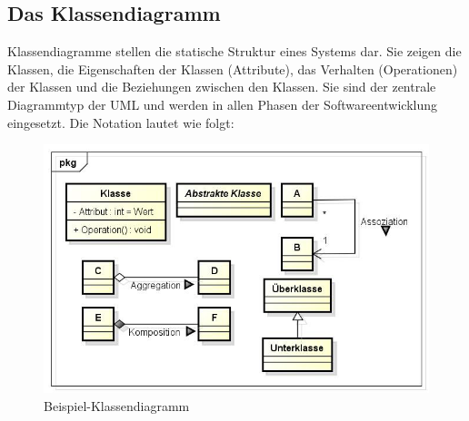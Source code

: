 \documentclass[a4paper,10pt,DIV9, BCOR12mm, oneside,openright,openbib]{scrreprt}
\theoremstyle{definition}
\theoremstyle{plain}
\begin{document}
\subsection{Das Klassendiagramm}
Klassendiagramme stellen die statische Struktur eines Systems dar. Sie zeigen die Klassen, die Eigenschaften der Klassen (Attribute), das Verhalten (Operationen)  der Klassen und die Beziehungen zwischen den Klassen. Sie sind der zentrale Diagrammtyp der UML und werden in allen Phasen der Softwareentwicklung eingesetzt. Die Notation lautet wie folgt:
\begin{figure}[h]
 \centering
 \includegraphics[scale=0.55,keepaspectratio=true]{./Bilder/classdiagr.jpg}
 \caption{Beispiel-Klassendiagramm}
 \label{fig:Klassendiagramm}
\end{figure}
\end{document}
